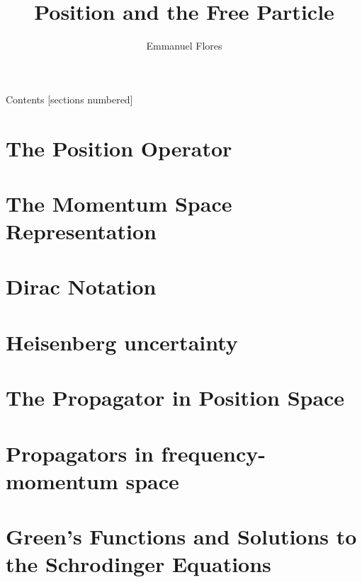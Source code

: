 \documentclass[12pt]{beamer}
\title{Position and the Free Particle}
\author{Emmanuel Flores}
\institute{Advanced Mathematical Methods, Tufts University}
\begin{document}
\maketitle

\begin{frame}{Contents}
	[sections numbered]
	\tableofcontents
\end{frame}

\section[The Position Operator]{The Position Operator}

\section[The Momentum Space Representation]{The Momentum Space Representation}

\section[Dirac Notation]{Dirac Notation}

\section{Heisenberg uncertainty}

\section{The Propagator in Position Space}

\section{Propagators in frequency-momentum space}

\section{Green's Functions and Solutions to the Schrodinger Equations}
\end{document}
